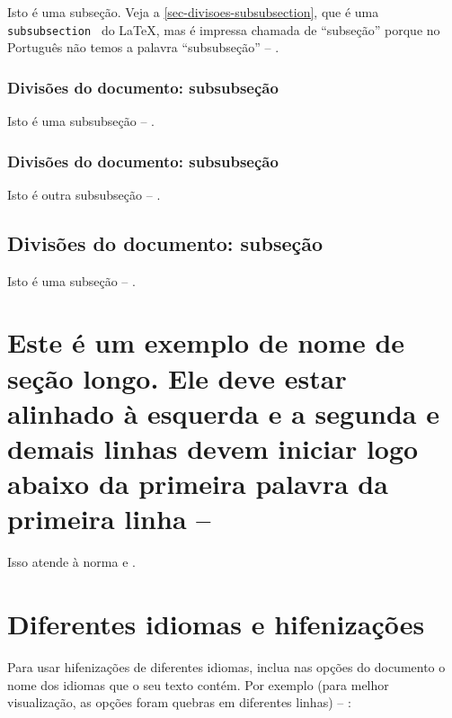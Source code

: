 Isto é uma subseção. Veja a \autoref{sec-divisoes-subsubsection}, que é uma
\texttt{subsubsection  } do \LaTeX{}, mas é impressa chamada de ``subseção'' porque
no Português não temos a palavra ``subsubseção'' -- \showfont.



\subsubsection{Divisões do documento: subsubseção}
\label{sec-divisoes-subsubsection}

Isto é uma subsubseção -- \showfont.



\subsubsection{Divisões do documento: subsubseção}

Isto é outra subsubseção -- \showfont.



\subsection{Divisões do documento: subseção}\label{sec-exemplo-subsec}

Isto é uma subseção -- \showfont.



\section[Exemplo muito longo]{Este é um exemplo de nome de seção longo. Ele deve estar
  alinhado à esquerda e a segunda e demais linhas devem iniciar logo abaixo da
  primeira palavra da primeira linha -- \showfont}

Isso atende à norma \textcite[seções de 5.2.2 a 5.2.4]{NBR14724:2011}
e \textcite[seções de 3.1 a 3.8]{NBR6024:2012}.



\section{Diferentes idiomas e hifenizações}
\label{sec-hifenizacao}

Para usar hifenizações de diferentes idiomas, inclua nas opções do documento o
nome dos idiomas que o seu texto contém. Por exemplo (para melhor
visualização, as opções foram quebras em diferentes linhas) -- \showfont:

